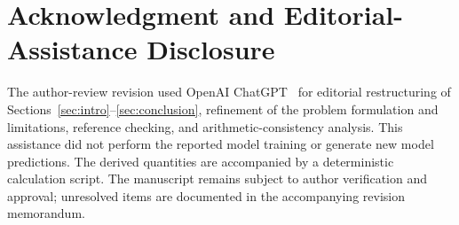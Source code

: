 \documentclass[journal]{IEEEtran}
\begin{document}
\section*{Acknowledgment and Editorial-Assistance Disclosure}
The author-review revision used OpenAI ChatGPT~\cite{openai2026chatgpt} for editorial restructuring of Sections~\ref{sec:intro}--\ref{sec:conclusion}, refinement of the problem formulation and limitations, reference checking, and arithmetic-consistency analysis. This assistance did not perform the reported model training or generate new model predictions. The derived quantities are accompanied by a deterministic calculation script. The manuscript remains subject to author verification and approval; unresolved items are documented in the accompanying revision memorandum.



\end{document}
